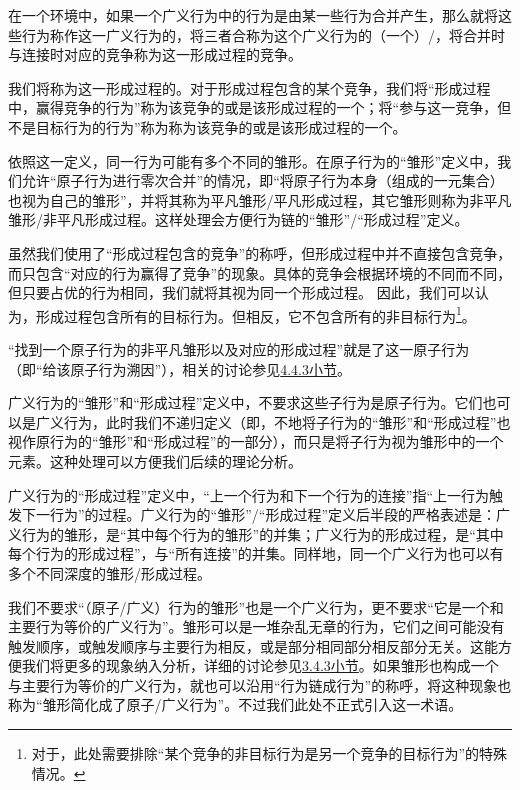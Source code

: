 在一个环境中，如果一个广义行为中的行为是由某一些行为合并产生，那么就将这些行为称作这一广义行为的，将三者合称为这个广义行为的（一个）/，将合并时与连接时对应的竞争称为这一形成过程的竞争。

我们将称为这一形成过程的。对于形成过程包含的某个竞争，我们将“形成过程中，赢得竞争的行为”称为该竞争的或是该形成过程的一个；将“参与这一竞争，但不是目标行为的行为”称为称为该竞争的或是该形成过程的一个。
\begin{explain}
依照这一定义，同一行为可能有多个不同的雏形。在原子行为的“雏形”定义中，我们允许“原子行为进行零次合并”的情况，即“将原子行为本身（组成的一元集合）也视为自己的雏形”，并将其称为平凡雏形/平凡形成过程，其它雏形则称为非平凡雏形/非平凡形成过程。这样处理会方便行为链的“雏形”/“形成过程”定义。

虽然我们使用了“形成过程包含的竞争”的称呼，但形成过程中并不直接包含竞争，而只包含“对应的行为赢得了竞争”的现象。具体的竞争会根据环境的不同而不同，但只要占优的行为相同，我们就将其视为同一个形成过程。%
因此，我们可以认为，形成过程包含所有的目标行为。但相反，它不包含所有的非目标行为\footnote{对于\rigorous，此处需要排除“某个竞争的非目标行为是另一个竞争的目标行为”的特殊情况。}。

“找到一个原子行为的非平凡雏形以及对应的形成过程”就是了这一原子行为（即“给该原子行为溯因”），相关的讨论参见\hyperref[sec:对竞争过程的解读]{4.4.3小节}。

广义行为的“雏形”和“形成过程”定义中，不要求这些子行为是原子行为。它们也可以是广义行为，此时我们不递归定义（即，不地将子行为的“雏形”和“形成过程”也视作原行为的“雏形”和“形成过程”的一部分），而只是将子行为视为雏形中的一个元素。这种处理可以方便我们后续的理论分析。

广义行为的“形成过程”定义中，“上一个行为和下一个行为的连接”指“上一行为触发下一行为”的过程。广义行为的“雏形”/“形成过程”定义后半段的严格表述是：广义行为的雏形，是“其中每个行为的雏形”的并集；广义行为的形成过程，是“其中每个行为的形成过程”，与“所有连接”的并集。同样地，同一个广义行为也可以有多个不同深度的雏形/形成过程。

我们不要求“（原子/广义）行为的雏形”也是一个广义行为，更不要求“它是一个和主要行为等价的广义行为”。雏形可以是一堆杂乱无章的行为，它们之间可能没有触发顺序，或触发顺序与主要行为相反，或是部分相同部分相反部分无关。这能方便我们将更多的现象纳入分析，详细的讨论参见\hyperref[sec:行为的转化与合并]{3.4.3小节}。如果雏形也构成一个与主要行为等价的广义行为，就也可以沿用“行为链成行为”的称呼，将这种现象也称为“雏形简化成了原子/广义行为”。不过我们此处不正式引入这一术语。


\end{explain}

